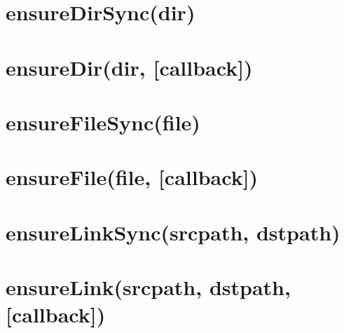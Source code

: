 \documentclass[twoside]{book}
\newcommand{\+}{\discretionary{\mbox{\scriptsize$\hookleftarrow$}}{}{}}
\begin{document}
\chapter{ensure\+Dir\+Sync(dir)}
\label{md__c_1_workspace_demo_src_main_script_node_modules_fs-extra_docs_ensure_dir-sync}

\chapter{ensure\+Dir(dir, \mbox{[}callback\mbox{]})}
\label{md__c_1_workspace_demo_src_main_script_node_modules_fs-extra_docs_ensure_dir}

\chapter{ensure\+File\+Sync(file)}
\label{md__c_1_workspace_demo_src_main_script_node_modules_fs-extra_docs_ensure_file-sync}

\chapter{ensure\+File(file, \mbox{[}callback\mbox{]})}
\label{md__c_1_workspace_demo_src_main_script_node_modules_fs-extra_docs_ensure_file}

\chapter{ensure\+Link\+Sync(srcpath, dstpath)}
\label{md__c_1_workspace_demo_src_main_script_node_modules_fs-extra_docs_ensure_link-sync}

\chapter{ensure\+Link(srcpath, dstpath, \mbox{[}callback\mbox{]})}
\label{md__c_1_workspace_demo_src_main_script_node_modules_fs-extra_docs_ensure_link}

\end{document}
